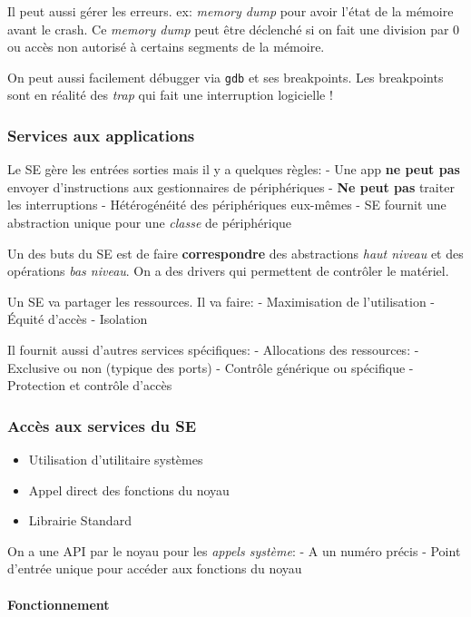 Il peut aussi gérer les erreurs. ex: \emph{memory dump} pour avoir
l'état de la mémoire avant le crash. Ce \emph{memory dump} peut être
déclenché si on fait une division par 0 ou accès non autorisé à certains
segments de la mémoire.

On peut aussi facilement débugger via \texttt{gdb} et ses breakpoints.
Les breakpoints sont en réalité des \emph{trap} qui fait une
interruption logicielle !

\subsubsection{Services aux
applications}\label{services-aux-applications}

Le SE gère les entrées sorties mais il y a quelques règles: - Une app
\textbf{ne peut pas} envoyer d'instructions aux gestionnaires de
périphériques - \textbf{Ne peut pas} traiter les interruptions -
Hétérogénéité des périphériques eux-mêmes - SE fournit une abstraction
unique pour une \emph{classe} de périphérique

Un des buts du SE est de faire \textbf{correspondre} des abstractions
\emph{haut niveau} et des opérations \emph{bas niveau}. On a des drivers
qui permettent de contrôler le matériel.

Un SE va partager les ressources. Il va faire: - Maximisation de
l'utilisation - Équité d'accès - Isolation

Il fournit aussi d'autres services spécifiques: - Allocations des
ressources: - Exclusive ou non (typique des ports) - Contrôle générique
ou spécifique - Protection et contrôle d'accès

\subsubsection{Accès aux services du
SE}\label{accuxe8s-aux-services-du-se}

\begin{itemize}
\tightlist
\item
  Utilisation d'utilitaire systèmes
\item
  Appel direct des fonctions du noyau
\item
  Librairie Standard
\end{itemize}

On a une API par le noyau pour les \emph{appels système}: - A un numéro
précis - Point d'entrée unique pour accéder aux fonctions du noyau

\paragraph{Fonctionnement}\label{fonctionnement}

